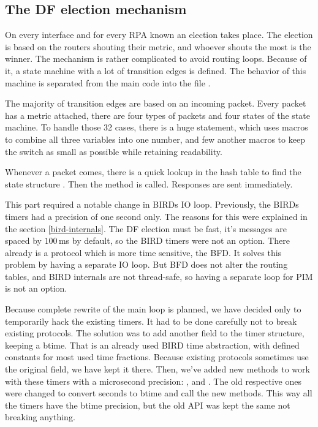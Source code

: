 \subsection{The DF election mechanism}
On every interface and for every RPA known an election takes place. The
election is based on the routers shouting their metric, and whoever shouts the
most is the winner. The mechanism is rather complicated to avoid routing loops.
Because of it, a state machine with a lot of transition edges is defined. The
behavior of this machine is separated from the main code into the file
.

The majority of transition edges are based on an incoming packet. Every packet
has a metric attached, there are four types of packets and four states of the
state machine. To handle those 32 cases, there is a huge 
statement, which uses macros to combine all three variables into one number,
and few another macros to keep the switch as small as possible while retaining
readability.

Whenever a packet comes, there is a quick lookup in the hash table to find the
state structure . Then the  method is
called. Responses are sent immediately.

This part required a notable change in BIRDs IO loop. Previously, the BIRDs
timers had a precision of one second only. The reasons for this were explained
in the section \ref{bird-internals}. The DF election must be fast, it's
messages are spaced by $100\,$ms by default, so the BIRD timers were not an
option. There already is a protocol which is more time sensitive, the BFD. It
solves this problem by having a separate IO loop. But BFD does not alter the
routing tables, and BIRD internals are not thread-safe, so having a separate
loop for PIM is not an option.

Because complete rewrite of the main loop is planned, we have decided only to
temporarily hack the existing timers. It had to be done carefully not to break
existing protocols. The solution was to add another field to the timer
structure, keeping a btime. That is an already used BIRD time abstraction, with
defined constants for most used time fractions. Because existing protocols
sometimes use the original field, we have kept it there. Then, we've added new
methods to work with these timers with a microsecond precision:
,  and
. The old respective ones were changed
to convert seconds to btime and call the new methods. This way all the timers
have the btime precision, but the old API was kept the same not breaking
anything.


